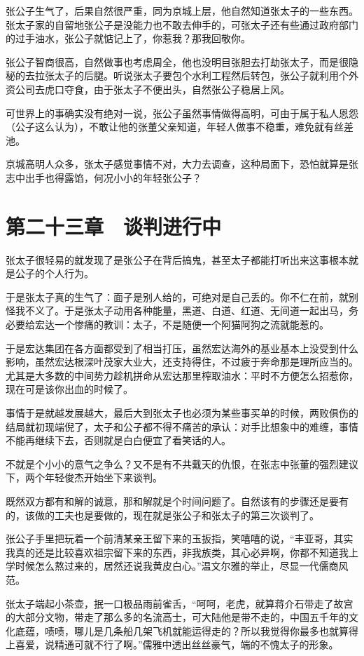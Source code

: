 张公子生气了，后果自然很严重，同为京城上层，他自然知道张太子的一些东西。张太子家的自留地张公子是没能力也不敢去伸手的，可张太子还有些通过政府部门的过手油水，张公子就惦记上了，你惹我？那我回敬你。

张公子智商很高，自然做事也考虑周全，他也没明目张胆去打劫张太子，而是很隐秘的去拉张太子的后腿。听说张太子要包个水利工程然后转包，张公子就利用个外资公司去虎口夺食，由于张太子不便出头，自然张公子稳居上风。

可世界上的事确实没有绝对一说，张公子虽然事情做得高明，可由于属于私人恩怨（公子这么认为），不敢让他的张董父亲知道，年轻人做事不稳重，难免就有丝差池。

京城高明人众多，张太子感觉事情不对，大力去调查，这种局面下，恐怕就算是张志中出手也得露馅，何况小小的年轻张公子？

\section{第二十三章　谈判进行中}

张太子很轻易的就发现了是张公子在背后搞鬼，甚至太子都能打听出来这事根本就是公子的个人行为。

于是张太子真的生气了：面子是别人给的，可绝对是自己丢的。你不仁在前，就别怪我不义了。于是张太子动用各种能量，黑道、白道、红道、无间道一起出马，务必要给宏达一个惨痛的教训：太子，不是随便一个阿猫阿狗之流就能惹的。

于是宏达集团在各方面都受到了相当打压，虽然宏达海外的基业基本上没受到什么影响，虽然宏达根深叶茂家大业大，还支持得住，不过疲于奔命那是理所应当的。尤其是大多数的中间势力趁机拼命从宏达那里榨取油水：平时不方便怎么招惹你，现在可是该你出血的时候了。

事情于是就越发展越大，最后大到张太子也必须为某些事买单的时候，两败俱伤的结局就初现端倪了，太子和公子都不得不痛苦的承认：对手比想象中的难缠，事情不能再继续下去，否则就是白白便宜了看笑话的人。

不就是个小小的意气之争么？又不是有不共戴天的仇恨，在张志中张董的强烈建议下，两个年轻俊杰开始坐下来谈判。

既然双方都有和解的诚意，那和解就是个时间问题了。自然该有的步骤还是要有的，该做的工夫也是要做的，现在就是张公子和张太子的第三次谈判了。

张公子手里把玩着一个前清某亲王留下来的玉扳指，笑嘻嘻的说，“丰亚哥，其实我真的还是比较喜欢祖宗留下来的东西，非我族类，其心必异啊，你都不知道我上学时候怎么熬过来的，居然还说我黄皮白心。”温文尔雅的举止，尽显一代儒商风范。

张太子端起小茶壶，抿一口极品雨前雀舌，“呵呵，老虎，就算蒋介石带走了故宫的大部分文物，带走了那么多的名流高士，可大陆他是带不走的，中国五千年的文化底蕴，啧啧，哪儿是几条船几架飞机就能运得走的？所以我觉得你最多也就算得上喜爱，说精通可就不行了啊。”儒雅中透出丝丝豪气，端的不愧太子的形象。

